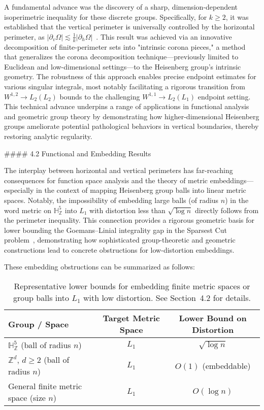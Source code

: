 \documentclass[11pt]{article}
\begin{document}
A fundamental advance was the discovery of a sharp, dimension-dependent isoperimetric inequality for these discrete groups. Specifically, for $k \geq 2$, it was established that the vertical perimeter is universally controlled by the horizontal perimeter, as $|\partial_{v}\Omega| \lesssim \frac{1}{k} |\partial_{h}\Omega|$~\cite{ref108}. This result was achieved via an innovative decomposition of finite-perimeter sets into "intrinsic corona pieces," a method that generalizes the corona decomposition technique—previously limited to Euclidean and low-dimensional settings—to the Heisenberg group's intrinsic geometry. The robustness of this approach enables precise endpoint estimates for various singular integrals, most notably facilitating a rigorous transition from $W^{1,2} \to L_2(L_2)$ bounds to the challenging $W^{1,1} \to L_2(L_1)$ endpoint setting. This technical advance underpins a range of applications in functional analysis and geometric group theory by demonstrating how higher-dimensional Heisenberg groups ameliorate potential pathological behaviors in vertical boundaries, thereby restoring analytic regularity.

#### 4.2 Functional and Embedding Results

The interplay between horizontal and vertical perimeters has far-reaching consequences for function space analysis and the theory of metric embeddings—especially in the context of mapping Heisenberg group balls into linear metric spaces. Notably, the impossibility of embedding large balls (of radius $n$) in the word metric on $\mathbb{H}^5_{\mathbb{Z}}$ into $L_1$ with distortion less than $\sqrt{\log n}$ directly follows from the perimeter inequality. This connection provides a rigorous geometric basis for lower bounding the Goemans–Linial integrality gap in the Sparsest Cut problem~\cite{ref108}, demonstrating how sophisticated group-theoretic and geometric constructions lead to concrete obstructions for low-distortion embeddings.

These embedding obstructions can be summarized as follows:

\begin{table}[htbp]
    \centering
    \begin{tabular}{lcc}
    \toprule
    \textbf{Group / Space} & \textbf{Target Metric Space} & \textbf{Lower Bound on Distortion}\\
    \midrule
    $\mathbb{H}^5_{\mathbb{Z}}$ (ball of radius $n$) & $L_1$ & $\sqrt{\log n}$\\
    $\mathbb{Z}^d$, $d\geq 2$ (ball of radius $n$) & $L_1$ & $O(1)$ (embeddable)\\
    General finite metric space (size $n$) & $L_1$ & $O(\log n)$\\
    \bottomrule
    \end{tabular}
    \caption{Representative lower bounds for embedding finite metric spaces or group balls into $L_1$ with low distortion. See Section~4.2 for details.}
    \label{tab:embedding_bounds}
\end{table}
\end{document}
